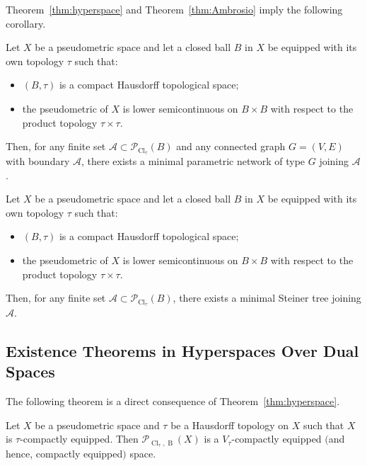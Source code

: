 \documentclass{svproc}
\def\Cl{\operatorname{Cl}}
\def\B{\operatorname{B}}
\begin{document}
Theorem~\ref{thm:hyperspace} and Theorem~\ref{thm:Ambrosio} imply the following corollary.

\begin{corollary}\label{cor:hyperspace_param_net}
Let $X$ be a pseudometric space and let a closed ball $B$ in $X$ be equipped with its own topology $\tau$ such that$:$
\begin{itemize}
\item $(B, \tau)$ is a compact Hausdorff topological space$;$
\item the pseudometric of $X$ is lower semicontinuous on $B\times B$ with respect to the product topology $\tau\times \tau$.
\end{itemize}
Then, for any finite set $\mathcal{A}\subset \mathcal{P}_{\Cl_{\tau}}(B)$ and any connected graph $G = (V, E)$ with boundary $\mathcal{A}$, there exists a minimal parametric network of type $G$ joining $\mathcal{A}$.
\end{corollary}

\begin{corollary}\label{cor:hyperspace_St}
Let $X$ be a pseudometric space and let a closed ball $B$ in $X$ be equipped with its own topology $\tau$ such that$:$
\begin{itemize}
\item $(B, \tau)$ is a compact Hausdorff topological space$;$
\item the pseudometric of $X$ is lower semicontinuous on $B\times B$ with respect to the product topology $\tau\times \tau$.
\end{itemize}
Then, for any finite set $\mathcal{A}\subset \mathcal{P}_{\Cl_{\tau}}(B)$, there exists a minimal Steiner tree joining $\mathcal{A}$.
\end{corollary}


\subsection{Existence Theorems in Hyperspaces Over Dual Spaces}\label{sec:hyp_dual}

The following theorem is a direct consequence of Theorem~\ref{thm:hyperspace}.

\begin{theorem}\label{thm:hyperspace_param_net_tau}
Let $X$ be a pseudometric space and $\tau$ be a Hausdorff topology on $X$ such that $X$ is $\tau$-compactly equipped. Then $\mathcal{P}_{\Cl_{\tau}, \B}(X)$ is a $V_{\tau}$-compactly equipped $($and hence, compactly equipped$)$ space.
\end{theorem}
\end{document}
